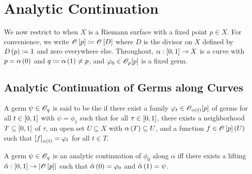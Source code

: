 \documentclass[../Moduli_Spaces_of_Riemann_Surfaces.tex]{subfiles}
\begin{document}
    \section{Analytic Continuation}
    We now restrict to when $X$ is a Riemann surface with a fixed point $p\in X$. For convenience, we write $\mathscr{O}\left[p\right]\coloneqq\mathscr{O}\left[D\right]$ where $D$ is the divisor on $X$ defined by $D\left(p\right)\coloneqq1$ and zero everywhere else. Throughout, $\alpha:\left[0,1\right]\to X$ is a curve with $p=\alpha\left(0\right)$ and $q\coloneqq\alpha\left(1\right)\neq p$, and $\varphi_0\in\mathscr{O}_p\!\left[p\right]$ is a fixed germ.
    \subsection{Analytic Continuation of Germs along Curves}
    \begin{definition}
        A germ $\psi\in\mathscr{O}_q$ is said to be the  if there exist a family $\varphi_t\in\mathscr{O}_{\alpha\left(t\right)}\!\left[p\right]$ of germs for all $t\in\left[0,1\right]$ with $\psi=\phi_1$ such that for all $\tau\in\left[0,1\right]$, there exists a neighborhood $T\subseteq\left[0,1\right]$ of $\tau$, an open set $U\subseteq X$ with $\alpha\left(T\right)\subseteq U$, and a function $f\in\mathscr{O}\left[p\right]\left(U\right)$ such that $\left[f\right]_{\alpha\left(t\right)}=\varphi_t$ for all $t\in T$.
    \end{definition}
    \begin{proposition}
        A germ $\psi\in\mathscr{O}_q$ is an analytic continuation of $\phi_0$ along $\alpha$ iff there exists a lifting $\tilde{\alpha}:\left[0,1\right]\to\left|\mathscr{O}\left[p\right]\right|$ such that $\tilde{\alpha}\left(0\right)=\varphi_0$ and $\tilde{\alpha}\left(1\right)=\psi$.
    \end{proposition}
\end{document}
